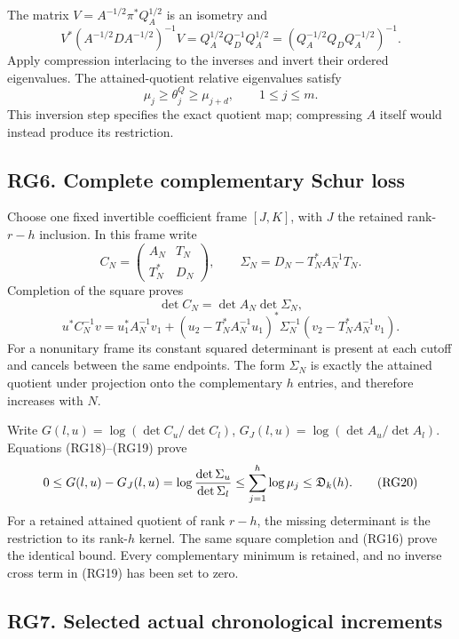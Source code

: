 \documentclass[11pt]{article}
\begin{document}
The matrix \(V=A^{-1/2}\pi^*Q_A^{1/2}\) is an isometry and \[
V^*(A^{-1/2}DA^{-1/2})^{-1}V
=Q_A^{1/2}Q_D^{-1}Q_A^{1/2}
=(Q_A^{-1/2}Q_DQ_A^{-1/2})^{-1}.
\] Apply compression interlacing to the inverses and invert their ordered eigenvalues. The attained-quotient relative eigenvalues satisfy \[
\mu_j\ge\theta_j^Q\ge\mu_{j+d},\qquad1\le j\le m.
\tag{RG18}
\] This inversion step specifies the exact quotient map; compressing \(A\) itself would instead produce its restriction.

\subsection{RG6. Complete complementary Schur loss}\label{rg6.-complete-complementary-schur-loss}

Choose one fixed invertible coefficient frame \([J,K]\), with \(J\) the retained rank-\(r-h\) inclusion. In this frame write \[
C_N=\begin{pmatrix}A_N&T_N\\T_N^*&D_N\end{pmatrix},\qquad
\Sigma_N=D_N-T_N^*A_N^{-1}T_N.
\] Completion of the square proves \[
\det C_N=\det A_N\det\Sigma_N,
\] \[
u^*C_N^{-1}v=u_1^*A_N^{-1}v_1+
(u_2-T_N^*A_N^{-1}u_1)^*\Sigma_N^{-1}
(v_2-T_N^*A_N^{-1}v_1).
\tag{RG19}
\] For a nonunitary frame its constant squared determinant is present at each cutoff and cancels between the same endpoints. The form \(\Sigma_N\) is exactly the attained quotient under projection onto the complementary \(h\) entries, and therefore increases with \(N\).

Write \(G(l,u)=\log(\det C_u/\det C_l)\), \(G_J(l,u)=\log(\det A_u/\det A_l)\). Equations (RG18)--(RG19) prove \[
0\le G(l,u)-G_J(l,u)
=\log{\det\Sigma_u\over\det\Sigma_l}
\le\sum_{j=1}^h\log\mu_j\le\mathfrak D_k(h).
\tag{RG20}
\] For a retained attained quotient of rank \(r-h\), the missing determinant is the restriction to its rank-\(h\) kernel. The same square completion and (RG16) prove the identical bound. Every complementary minimum is retained, and no inverse cross term in (RG19) has been set to zero.

\subsection{RG7. Selected actual chronological increments}\label{rg7.-selected-actual-chronological-increments}
\end{document}
